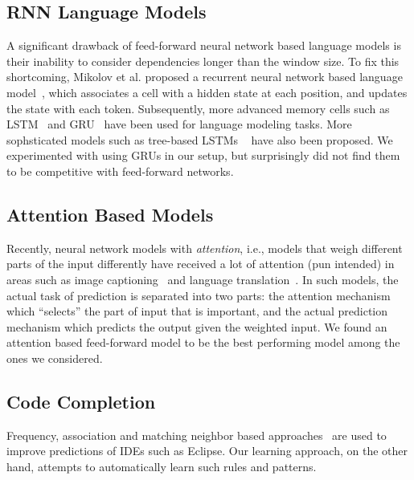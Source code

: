 \subsection{RNN Language Models}
\label{sec:rnnlm}
A significant drawback of feed-forward neural network based language models is
their inability to consider dependencies longer than the window size. To fix
this shortcoming, Mikolov et al. proposed a recurrent neural network based
language model~\cite{ref:rnnlm}, which associates a cell with a hidden state
at each position, and updates the state with each token. Subsequently, more
advanced memory cells such as LSTM~\cite{ref:lstm} and GRU~\cite{ref:gru} have
been used for language modeling tasks. More sophsticated models such as
tree-based LSTMs ~\cite{ref:treelstm} have also
been proposed. We experimented with using GRUs in our setup, but surprisingly
did not find them to be competitive with feed-forward networks.

\subsection{Attention Based Models}
\label{sec:attn}
Recently, neural network models with {\it attention}, i.e., models that weigh
different parts of the input differently have received a lot of attention (pun
intended) in areas such as image captioning~\cite{ref:showattendtell} and
language translation~\cite{ref:nmt,ref:nmt2}. In such models, the actual task of
prediction is separated into two parts: the attention mechanism which
``selects'' the part of input that is important, and the actual prediction
mechanism which predicts the output given the weighted input. We found an
attention based feed-forward model to be the best performing model among the
ones we considered.

\subsection{Code Completion}
\label{sec:code-completion}
Frequency, association and matching neighbor based
approaches~\cite{ref:learningexamples} are used to improve predictions of IDEs such
as Eclipse.
Our learning approach, on the other hand, attempts to automatically
learn such rules and patterns.
